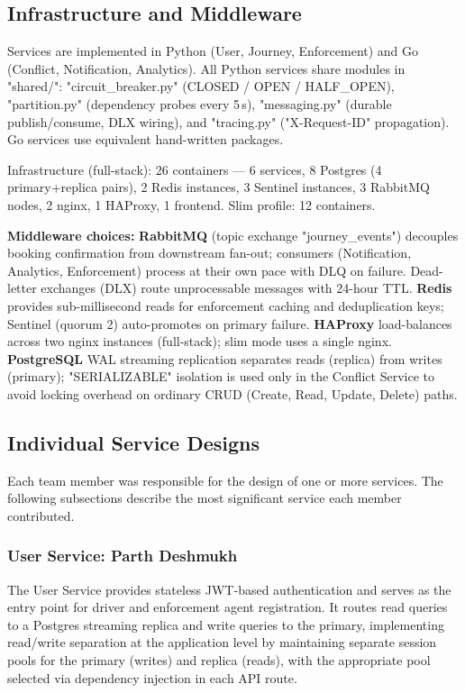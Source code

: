 \documentclass[11pt,a4paper]{article}
\begin{document}
 
\subsection{Infrastructure and Middleware}

Services are implemented in Python (User, Journey, Enforcement) and Go (Conflict, Notification, Analytics). All Python services share modules in "shared/": "circuit\_breaker.py" (CLOSED / OPEN / HALF\_OPEN), "partition.py" (dependency probes every 5\,s), "messaging.py" (durable publish/consume, DLX wiring), and "tracing.py" ("X-Request-ID" propagation). Go services use equivalent hand-written packages.

Infrastructure (full-stack): 26 containers — 6 services, 8 Postgres (4 primary+replica pairs), 2 Redis instances, 3 Sentinel instances, 3 RabbitMQ nodes, 2 nginx, 1 HAProxy, 1 frontend. Slim profile: 12 containers.

\textbf{Middleware choices:} \textbf{RabbitMQ} (topic exchange "journey\_events") decouples booking confirmation from downstream fan-out; consumers (Notification, Analytics, Enforcement) process at their own pace with DLQ on failure. Dead-letter exchanges (DLX) route unprocessable messages with 24-hour TTL. \textbf{Redis} provides sub-millisecond reads for enforcement caching and deduplication keys; Sentinel (quorum 2) auto-promotes on primary failure. \textbf{HAProxy} load-balances across two nginx instances (full-stack); slim mode uses a single nginx. \textbf{PostgreSQL} WAL streaming replication separates reads (replica) from writes (primary); "SERIALIZABLE" isolation is used only in the Conflict Service to avoid locking overhead on ordinary CRUD (Create, Read, Update, Delete) paths.

\subsection{Individual Service Designs}
 
Each team member was responsible for the design of one or more services. The following subsections describe the most significant service each member contributed.
 
\subsubsection{User Service: Parth Deshmukh}
 
The User Service provides stateless JWT-based authentication and serves as the entry point for driver and enforcement agent registration. It routes read queries to a Postgres streaming replica and write queries to the primary, implementing read/write separation at the application level by maintaining separate session pools for the primary (writes) and replica (reads), with the appropriate pool selected via dependency injection in each API route.
\end{document}
